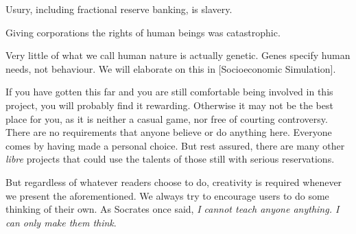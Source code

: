 
Usury, including fractional reserve banking, is slavery.


Giving corporations the rights of human beings was catastrophic.


Very little of what we call human nature is actually genetic. Genes specify human needs, not behaviour. We will elaborate on this in [Socioeconomic Simulation].
\stopitemize

If you have gotten this far and you are still comfortable being involved in this project, you will probably find it rewarding. Otherwise it may not be the best place for you, as it is neither a casual game, nor free of courting controversy. There are no requirements that anyone believe or do anything here. Everyone comes by having made a personal choice. But rest assured, there are many other {\it libre} projects that could use the talents of those still with serious reservations.

But regardless of whatever readers choose to do, creativity is required whenever we present the aforementioned. We always try to encourage users to do some thinking of their own. As Socrates once said, {\it I cannot teach anyone anything. I can only make them think}.

\StopChapter

